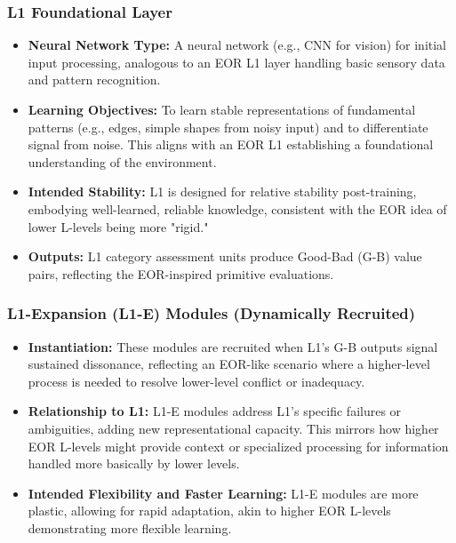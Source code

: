 \documentclass{article}
\begin{document}
\subsubsection{L1 Foundational Layer}
\begin{itemize}
    \item \textbf{Neural Network Type:} A neural network (e.g., CNN for vision) for initial input processing, analogous to an EOR L1 layer handling basic sensory data and pattern recognition.
    \item \textbf{Learning Objectives:} To learn stable representations of fundamental patterns (e.g., edges, simple shapes from noisy input) and to differentiate signal from noise. This aligns with an EOR L1 establishing a foundational understanding of the environment.
    \item \textbf{Intended Stability:} L1 is designed for relative stability post-training, embodying well-learned, reliable knowledge, consistent with the EOR idea of lower L-levels being more "rigid."
    \item \textbf{Outputs:} L1 category assessment units produce Good-Bad (G-B) value pairs, reflecting the EOR-inspired primitive evaluations.
\end{itemize}

\subsubsection{L1-Expansion (L1-E) Modules (Dynamically Recruited)}
\begin{itemize}
    \item \textbf{Instantiation:} These modules are recruited when L1's G-B outputs signal sustained dissonance, reflecting an EOR-like scenario where a higher-level process is needed to resolve lower-level conflict or inadequacy.
    \item \textbf{Relationship to L1:} L1-E modules address L1's specific failures or ambiguities, adding new representational capacity. This mirrors how higher EOR L-levels might provide context or specialized processing for information handled more basically by lower levels.
    \item \textbf{Intended Flexibility and Faster Learning:} L1-E modules are more plastic, allowing for rapid adaptation, akin to higher EOR L-levels demonstrating more flexible learning.
\end{itemize}
\end{document}
